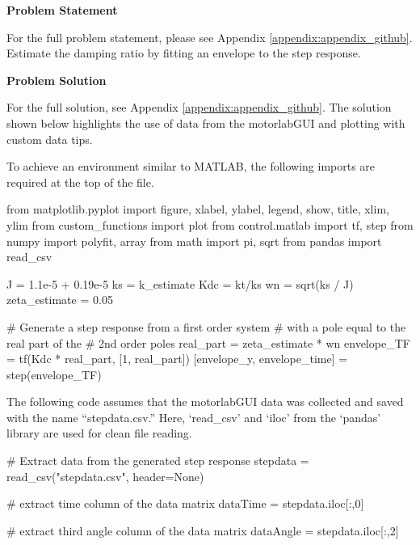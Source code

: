 \begin{tcolorbox}[breakable, enhanced jigsaw, title=ME 570: Assignment \ref{control_assignment_1}, 
    colframe=ksu-purple, colback=ksu-gray]

    \textbf{Problem Statement}
    \parindent15pt

    For the full problem statement, please see Appendix \ref{appendix:appendix_github}. Estimate
    the damping ratio by fitting an envelope to the step response.
    
    \tcblower
    \textbf{Problem Solution}
    \parindent15pt

    For the full solution, see Appendix \ref{appendix:appendix_github}. The solution shown below
    highlights the use of data from the motorlabGUI and plotting with custom data tips.

    To achieve an environment similar to MATLAB, the following imports are required at the top of the file.

\begin{python}
from matplotlib.pyplot import figure, xlabel, ylabel, legend, show, title, xlim, ylim
from custom_functions import plot
from control.matlab import tf, step
from numpy import polyfit, array
from math import pi, sqrt
from pandas import read_csv
\end{python}

\begin{python}
J = 1.1e-5 + 0.19e-5
ks = k_estimate
Kdc = kt/ks
wn = sqrt(ks / J)
zeta_estimate = 0.05
 
# Generate a step response from a first order system 
# with a pole equal to the real part of the
# 2nd order poles
real_part = zeta_estimate * wn
envelope_TF = tf(Kdc * real_part, [1, real_part])
[envelope_y, envelope_time] = step(envelope_TF)
\end{python}

The following code assumes that the motorlabGUI data was collected
and saved with the name ``stepdata.csv.'' Here, `read\_csv' and
`iloc' from the `pandas' library are used for clean file reading.

\begin{python}
# Extract data from the generated step response
stepdata = read_csv("stepdata.csv", header=None)

# extract time column of the data matrix
dataTime = stepdata.iloc[:,0]

# extract third angle column of the data matrix
dataAngle = stepdata.iloc[:,2]


\end{python}
\end{tcolorbox}
